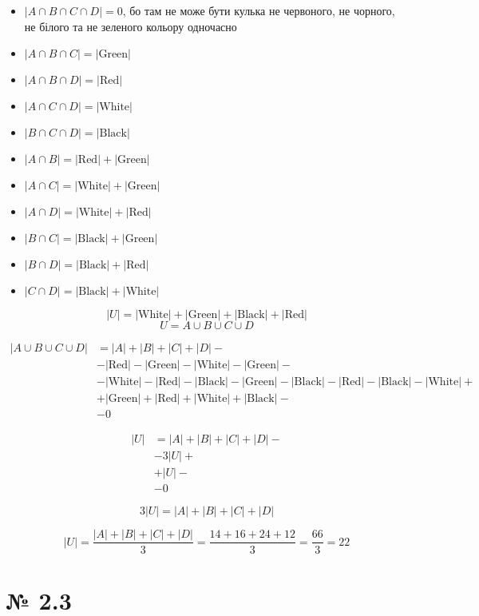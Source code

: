 \documentclass[11pt, a4paper]{article} %
\begin{document}
\begin{itemize}
    \item $|A\cap B \cap C\cap D| = 0$, бо там не може бути кулька не червоного, не чорного, не білого та не зеленого кольору одночасно
    \item $|A \cap B \cap C| = |\text{Green}|$
    \item $|A \cap B \cap D| = |\text{Red}|$
    \item $|A \cap C \cap D| = |\text{White}|$
    \item $|B \cap C \cap D| = |\text{Black}|$
    \item $|A\cap B| = |\text{Red}| + |\text{Green}|$
    \item $|A\cap C| = |\text{White}| + |\text{Green}|$
    \item $|A\cap D| = |\text{White}| + |\text{Red}|$
    \item $|B\cap C| = |\text{Black}| + |\text{Green}|$
    \item $|B\cap D| = |\text{Black}| + |\text{Red}|$
    \item $|C\cap D| = |\text{Black}| + |\text{White}|$
\end{itemize}

$$|U| = |\text{White}| + |\text{Green}| + |\text{Black}| + |\text{Red}|$$
$$U = A \cup B \cup C \cup D$$


\begin{align*}
    |A \cup B \cup C \cup D| &= |A| + |B| + |C| + |D| - \\
        &- |\text{Red}| - |\text{Green}| - |\text{White}| - |\text{Green}| -\\
        &- |\text{White}| - |\text{Red}| - |\text{Black}| - |\text{Green}| - |\text{Black}| - |\text{Red}| - |\text{Black}| - |\text{White}| + \\
        &+ |\text{Green}| + |\text{Red}| + |\text{White}| + |\text{Black}| -\\
        &- 0
\end{align*}

\begin{align*}
    |U| &= |A| + |B| + |C| + |D| - \\
        &- 3|U| + \\
        &+ |U| -\\
        &- 0
\end{align*}

$$3|U| = |A| + |B| + |C| + |D|$$
\begin{mdframed}[style=ans]
    $$|U| = \frac{|A| + |B| + |C| + |D|}{3} = \frac{14 + 16 + 24 + 12}{3} = \frac{66}{3} = 22$$
\end{mdframed}


\section*{№ 2.3}
\end{document}
